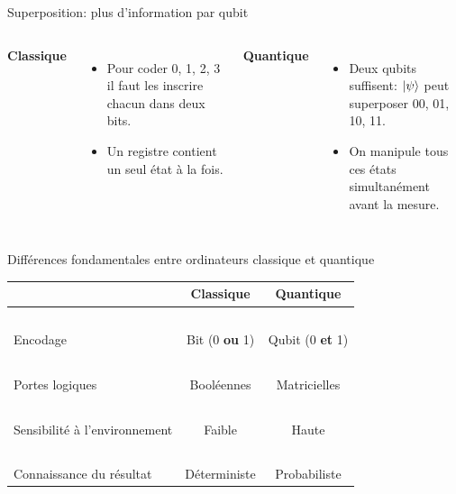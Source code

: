 \documentclass[aspectratio=169,12pt]{beamer}
\begin{document}
\begin{frame}{Superposition: plus d'information par qubit}
  \begin{columns}[T,onlytextwidth]
    \textbf{Classique}\\
    \begin{itemize}
      \item Pour coder 0, 1, 2, 3 il faut les inscrire chacun dans deux bits.
      \item Un registre contient un seul état à la fois.
    \end{itemize}
    \textbf{Quantique}\\
    \begin{itemize}
      \item Deux qubits suffisent: $\ket{\psi}$ peut superposer 00, 01, 10, 11.
      \item On manipule tous ces états simultanément avant la mesure.
    \end{itemize}
  \end{columns}
\end{frame}


\begin{frame}{Différences fondamentales entre ordinateurs classique et quantique}
  \centering
  \begin{tabular}{l|c|c}
    & Classique & Quantique \\\hline
    ~& ~ & ~\\
    Encodage & Bit (0 \textbf{ou} 1) & Qubit (0 \textbf{et} 1) \\
     ~& ~ & ~\\
    Portes logiques & Booléennes & Matricielles \\
    ~& ~ & ~\\
    Sensibilité à l'environnement & Faible & Haute \\
    ~& ~ & ~\\
    Connaissance du résultat & Déterministe & Probabiliste \\
  \end{tabular}
\end{frame}
\end{document}
